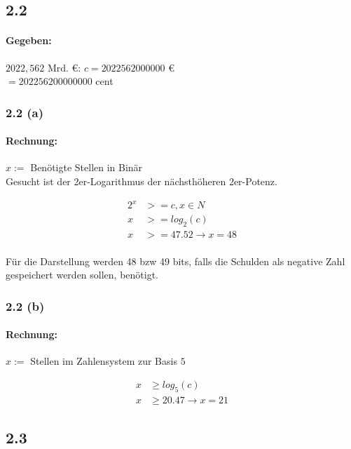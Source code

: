 \documentclass[11pt,a4paper]{article}
\begin{document}
\subsection{2.2}
\paragraph{Gegeben:}
$2022,562$ Mrd. \euro: $c = 2022562000000$ \euro\\
$= 202256200000000$ cent

\subsubsection{2.2 (a)}
\paragraph{Rechnung:}
$x :=$ Benötigte Stellen in Binär\\

Gesucht ist der 2er-Logarithmus der nächsthöheren 2er-Potenz.

\begin{align*}
2^x &>= c, x \in N\\
x &>= log_2(c)\\
x &>= 47.52 \rightarrow x = 48
\end{align*}

\paragraph{}
Für die Darstellung werden 48 bzw 49 bits, falls die Schulden als negative Zahl gespeichert werden sollen, benötigt.

\subsubsection{2.2 (b)}
\paragraph{Rechnung:}
$x := $ Stellen im Zahlensystem zur Basis $5$

\begin{align*}
x &\geq log_5(c)\\
x &\geq 20.47 \rightarrow x = 21
\end{align*}

\newpage
\subsection{2.3}
\end{document}
